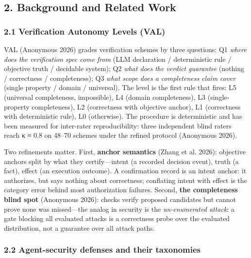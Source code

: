 \documentclass[

]{article}
\newcounter{none} %
\begin{document}
\subsection{2. Background and Related Work}\label{background-and-related-work}



\subsubsection{2.1 Verification Autonomy Levels (VAL)}\label{verification-autonomy-levels-val}



VAL (Anonymous 2026) grades verification schemes by three questions: Q1 \emph{where does the verification spec come from} (LLM declaration / deterministic rule / objective truth / decidable system); Q2 \emph{what does the verdict guarantee} (nothing / correctness / completeness); Q3 \emph{what scope does a completeness claim cover} (single property / domain / universal). The level is the first rule that fires: L5 (universal completeness, impossible), L4 (domain completeness), L3 (single-property completeness), L2 (correctness with objective anchor), L1 (correctness with deterministic rule), L0 (otherwise). The procedure is deterministic and has been measured for inter-rater reproducibility: three independent blind raters reach κ ≈ 0.8 on 48--70 schemes under the refined protocol (Anonymous 2026).



Two refinements matter. First, \textbf{anchor semantics} (Zhang et al. 2026): objective anchors split by what they certify---intent (a recorded decision event), truth (a fact), effect (an execution outcome). A confirmation record is an intent anchor: it authorizes, but says nothing about correctness; conflating intent with effect is the category error behind most authorization failures. Second, \textbf{the completeness blind spot} (Anonymous 2026): checks verify proposed candidates but cannot prove none was missed---the analog in security is the \emph{un-enumerated attack}: a gate blocking all evaluated attacks is a correctness probe over the evaluated distribution, not a guarantee over all attack paths.



\subsubsection{2.2 Agent-security defenses and their taxonomies}\label{agent-security-defenses-and-their-taxonomies}
\end{document}

